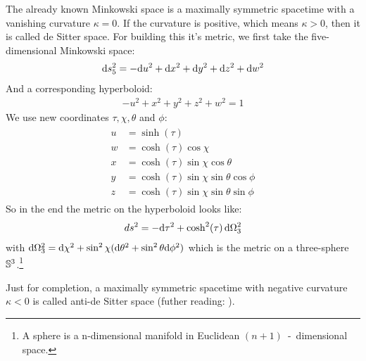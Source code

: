 	The already known Minkowski space is a maximally symmetric spacetime with a vanishing curvature $\kappa = 0$. If the curvature is positive, which means $\kappa > 0$, then it is called de Sitter space. For building this it's metric, we first take the five-dimensional Minkowski space:
		\begin{align}
			\mathrm{d} s^2_5 = -\mathrm{d} u^2 + \mathrm{d} x^2 + \mathrm{d} y^2 + \mathrm{d} z^2 + \mathrm{d} w^2
		\end{align}
	And a corresponding hyperboloid:
		\begin{align}
			-u^2 + x^2 + y^2 + z^2 + w^2 = 1
		\end{align}
	We use new coordinates $\tau, \chi, \theta$ and $\phi$:
		\begin{align}
			\begin{split}
			u &= \sinh (\tau) \\
			w &= \cosh (\tau) \cos \chi \\
			x &= \cosh (\tau) \sin \chi \cos \theta \\
			y &= \cosh (\tau) \sin \chi \sin \theta \cos \phi \\
			z &= \cosh (\tau) \sin \chi \sin \theta \sin \phi
			\end{split}
		\end{align}
	So in the end the metric on the hyperboloid looks like:
		\begin{align}
			ds^2 = -\mathrm{d} \tau^2 + \cosh^2(\tau) \, \mathrm{d} \Omega^2_3 
		\end{align}
	with $\mathrm{d} \Omega_3^2 = \mathrm{d} \chi^2 + \sin^2 \chi (\mathrm{d} \theta^2 + \sin^2 \theta \mathrm{d} \phi^2)$
	which is the metric on a three-sphere $\mathbb{S}^3$.\footnote{A sphere is a n-dimensional manifold in Euclidean $(n+1)$~-~dimensional space.}
	
	Just for completion, a maximally symmetric spacetime with negative curvature $\kappa < 0$ is called anti-de Sitter space (futher reading: \cite{SpacetimeCarroll}).
